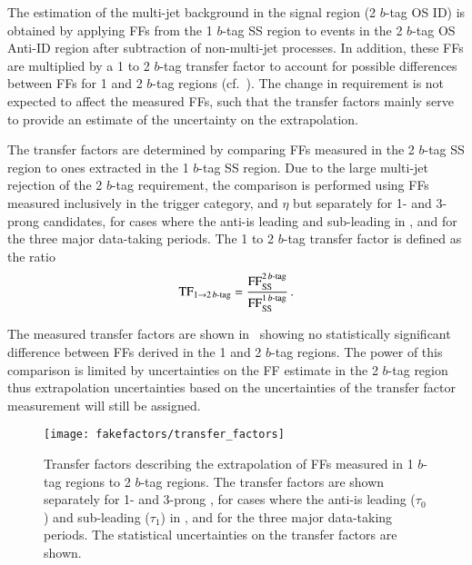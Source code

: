 The estimation of the multi-jet background in the \hadhad signal region (2
$b$-tag OS ID) is obtained by applying FFs from the 1 $b$-tag SS region to
events in the 2 $b$-tag OS Anti-ID region after subtraction of non-multi-jet
processes. In addition, these FFs are multiplied by a 1 to 2 $b$-tag transfer
factor to account for possible differences between FFs for 1 and 2 $b$-tag
regions (cf.\ ). The change in \btag requirement is
not expected to affect the measured FFs, such that the transfer factors mainly
serve to provide an estimate of the uncertainty on the extrapolation.

The transfer factors are determined by comparing FFs measured in the 2 $b$-tag
SS region to ones extracted in the 1 $b$-tag SS region. Due to the large
multi-jet rejection of the 2 $b$-tag requirement, the comparison is performed
using FFs measured inclusively in the trigger category, \tauhadvis \pT and
\tauhadvis $\eta$ but separately for 1- and 3-prong \tauhadvis candidates, for
cases where the anti-\tauhadvis is leading and sub-leading in \pT, and for the
three major data-taking periods. The 1 to 2 $b$-tag transfer factor is defined
as the ratio
\begin{align*}
  \text{TF}_{1 \rightarrow 2\,b\text{-tag}} = \frac{\text{FF}_{\text{SS}}^{2\,b\text{-tag}}}{\text{FF}_{\text{SS}}^{1\,b\text{-tag}}} \,\text{.}
\end{align*}

The measured transfer factors are shown in~
showing no statistically significant difference between FFs derived in the 1 and
2 $b$-tag regions. The power of this comparison is limited by uncertainties on
the FF estimate in the 2 $b$-tag region thus extrapolation uncertainties based
on the uncertainties of the transfer factor measurement will still be assigned.

\begin{figure}[htbp]
  \centering

  \texttt{[image: fakefactors/transfer\_factors]}

  \caption{Transfer factors describing the extrapolation of FFs measured in 1
    $b$-tag regions to 2 $b$-tag regions. The transfer factors are shown
    separately for 1- and 3-prong \tauhadvis, for cases where the
    anti-\tauhadvis is leading ($\tau_0$) and sub-leading ($\tau_1$) in \pT, and
    for the three major data-taking periods.  The statistical uncertainties on
    the transfer factors are shown.}%
  \label{fig:mjfakes_transfer_factor}
\end{figure}

